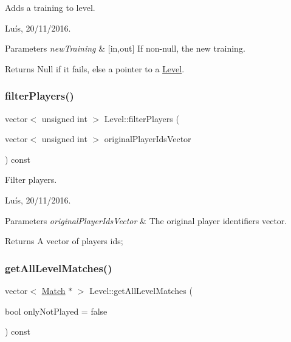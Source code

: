 Adds a training to level. 

Luís, 20/11/2016. 


\begin{DoxyParams}{Parameters}
{\em new\+Training} & \mbox{[}in,out\mbox{]} If non-\/null, the new training. \\
\hline
\end{DoxyParams}


\begin{DoxyReturn}{Returns}
Null if it fails, else a pointer to a \hyperlink{class_level}{Level}. 
\end{DoxyReturn}
\hypertarget{class_level_ac5d3ad313fb2694842f245fdb9499872}{}\label{class_level_ac5d3ad313fb2694842f245fdb9499872} 
\subsubsection{\texorpdfstring{filter\+Players()}{filterPlayers()}}
{\footnotesize\ttfamily vector$<$ unsigned int $>$ Level\+::filter\+Players (\begin{DoxyParamCaption}\item[{vector$<$ unsigned int $>$}]{original\+Player\+Ids\+Vector }\end{DoxyParamCaption}) const}



Filter players. 

Luís, 20/11/2016. 


\begin{DoxyParams}{Parameters}
{\em original\+Player\+Ids\+Vector} & The original player identifiers vector. \\
\hline
\end{DoxyParams}


\begin{DoxyReturn}{Returns}
A vector of players ids; 
\end{DoxyReturn}
\hypertarget{class_level_a67ede4d99accffb562e15c2c75cb81b8}{}\label{class_level_a67ede4d99accffb562e15c2c75cb81b8} 
\subsubsection{\texorpdfstring{get\+All\+Level\+Matches()}{getAllLevelMatches()}}
{\footnotesize\ttfamily vector$<$ \hyperlink{class_match}{Match} $\ast$ $>$ Level\+::get\+All\+Level\+Matches (\begin{DoxyParamCaption}\item[{bool}]{only\+Not\+Played = {\ttfamily false} }\end{DoxyParamCaption}) const}



